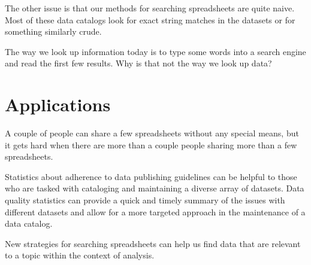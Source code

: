 \documentclass{acm_proc_article-sp}
\begin{document}
The other issue is that our methods for searching spreadsheets are quite naive.
Most of these data catalogs look for exact string matches in the datasets or
for something similarly crude.

The way we look up information today is to type some words into a search engine
and read the first few results. Why is that not the way we look up data?














\section{Applications}
A couple of people can share a few spreadsheets without any special means,
but it gets hard when there are more than a couple people sharing more than
a few spreadsheets.

Statistics about adherence to data publishing guidelines
can be helpful to those who are tasked
with cataloging and maintaining a diverse array of datasets. Data quality
statistics can provide a quick and timely summary of the issues with different
datasets and allow for a more targeted approach in the maintenance of a
data catalog.

New strategies for searching spreadsheets can help us find data that are
relevant to a topic within the context of analysis.



\balancecolumns
\end{document}
